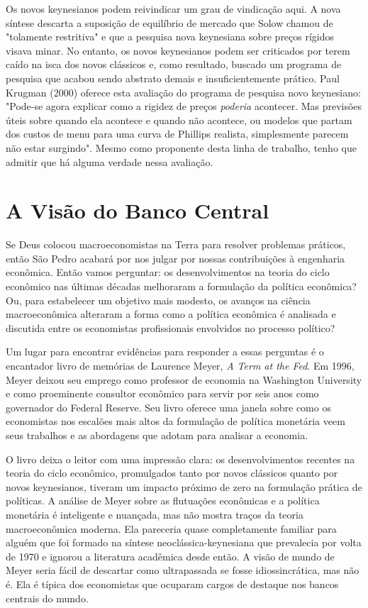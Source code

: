 \documentclass[12pt]{article}
\begin{document}
Os novos keynesianos podem reivindicar um grau de vindicação aqui. A nova síntese descarta a suposição de equilíbrio de mercado que Solow chamou de "tolamente restritiva" e que a pesquisa nova keynesiana sobre preços rígidos visava minar. No entanto, os novos keynesianos podem ser criticados por terem caído na isca dos novos clássicos e, como resultado, buscado um programa de pesquisa que acabou sendo abstrato demais e insuficientemente prático. Paul Krugman (2000) oferece esta avaliação do programa de pesquisa novo keynesiano: "Pode-se agora explicar como a rigidez de preços \textit{poderia} acontecer. Mas previsões úteis sobre quando ela acontece e quando não acontece, ou modelos que partam dos custos de menu para uma curva de Phillips realista, simplesmente parecem não estar surgindo". Mesmo como proponente desta linha de trabalho, tenho que admitir que há alguma verdade nessa avaliação.

\section{A Visão do Banco Central}

Se Deus colocou macroeconomistas na Terra para resolver problemas práticos, então São Pedro acabará por nos julgar por nossas contribuições à engenharia econômica. Então vamos perguntar: os desenvolvimentos na teoria do ciclo econômico nas últimas décadas melhoraram a formulação da política econômica? Ou, para estabelecer um objetivo mais modesto, os avanços na ciência macroeconômica alteraram a forma como a política econômica é analisada e discutida entre os economistas profissionais envolvidos no processo político?

Um lugar para encontrar evidências para responder a essas perguntas é o encantador livro de memórias de Laurence Meyer, \textit{A Term at the Fed}. Em 1996, Meyer deixou seu emprego como professor de economia na Washington University e como proeminente consultor econômico para servir por seis anos como governador do Federal Reserve. Seu livro oferece uma janela sobre como os economistas nos escalões mais altos da formulação de política monetária veem seus trabalhos e as abordagens que adotam para analisar a economia.

O livro deixa o leitor com uma impressão clara: os desenvolvimentos recentes na teoria do ciclo econômico, promulgados tanto por novos clássicos quanto por novos keynesianos, tiveram um impacto próximo de zero na formulação prática de políticas. A análise de Meyer sobre as flutuações econômicas e a política monetária é inteligente e nuançada, mas não mostra traços da teoria macroeconômica moderna. Ela pareceria quase completamente familiar para alguém que foi formado na síntese neoclássica-keynesiana que prevalecia por volta de 1970 e ignorou a literatura acadêmica desde então. A visão de mundo de Meyer seria fácil de descartar como ultrapassada se fosse idiossincrática, mas não é. Ela é típica dos economistas que ocuparam cargos de destaque nos bancos centrais do mundo.
\end{document}
